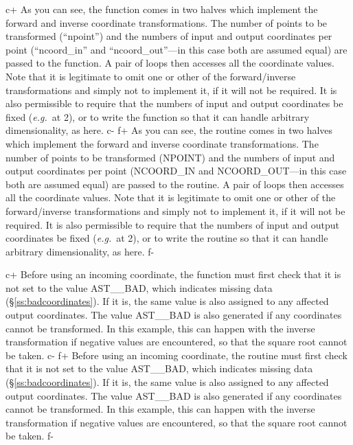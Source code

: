 \documentclass[twoside,11pt]{article}
\newcommand{\secref}[1]{\S\ref{#1}}
\newcommand{\secref}[1]{\ref{#1}}
\begin{document}
c+
As you can see, the function comes in two halves which implement the
forward and inverse coordinate transformations. The number of points
to be transformed (``npoint'') and the numbers of input and output
coordinates per point (``ncoord\_in'' and ``ncoord\_out''---in this
case both are assumed equal) are passed to the function. A pair of
loops then accesses all the coordinate values.  Note that it is
legitimate to omit one or other of the forward/inverse transformations
and simply not to implement it, if it will not be required. It is also
permissible to require that the numbers of input and output
coordinates be fixed ({\em{e.g.}}\ at 2), or to write the function so
that it can handle arbitrary dimensionality, as here.
c-
f+
As you can see, the routine comes in two halves which implement the
forward and inverse coordinate transformations. The number of points
to be transformed (NPOINT) and the numbers of input and output
coordinates per point (NCOORD\_IN and NCOORD\_OUT---in this case both
are assumed equal) are passed to the routine. A pair of loops then
accesses all the coordinate values.  Note that it is legitimate to
omit one or other of the forward/inverse transformations and simply
not to implement it, if it will not be required. It is also
permissible to require that the numbers of input and output
coordinates be fixed ({\em{e.g.}}\ at 2), or to write the routine so
that it can handle arbitrary dimensionality, as here.
f-

c+
Before using an incoming coordinate, the function must first check
that it is not set to the value AST\_\_BAD, which indicates missing
data (\secref{ss:badcoordinates}). If it is, the same value is also
assigned to any affected output coordinates. The value AST\_\_BAD is
also generated if any coordinates cannot be transformed. In this
example, this can happen with the inverse transformation if negative
values are encountered, so that the square root cannot be taken.
c-
f+
Before using an incoming coordinate, the routine must first check that
it is not set to the value AST\_\_BAD, which indicates missing data
(\secref{ss:badcoordinates}). If it is, the same value is also
assigned to any affected output coordinates. The value AST\_\_BAD is
also generated if any coordinates cannot be transformed. In this
example, this can happen with the inverse transformation if negative
values are encountered, so that the square root cannot be taken.
f-
\end{document}
